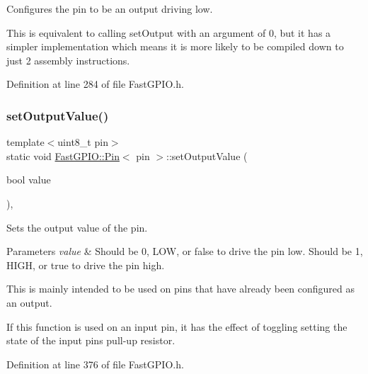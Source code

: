Configures the pin to be an output driving low. 

This is equivalent to calling set\+Output with an argument of 0, but it has a simpler implementation which means it is more likely to be compiled down to just 2 assembly instructions. 

Definition at line 284 of file Fast\+G\+P\+I\+O.\+h.

\mbox{\label{class_fast_g_p_i_o_1_1_pin_a2caa56e4e3691227794a39f4b233eb67}} 
\subsubsection{\texorpdfstring{set\+Output\+Value()}{setOutputValue()}}
{\footnotesize\ttfamily template$<$uint8\+\_\+t pin$>$ \\
static void \hyperlink{class_fast_g_p_i_o_1_1_pin}{Fast\+G\+P\+I\+O\+::\+Pin}$<$ pin $>$\+::set\+Output\+Value (\begin{DoxyParamCaption}\item[{bool}]{value }\end{DoxyParamCaption})\hspace{0.3cm}{\ttfamily [inline]}, {\ttfamily [static]}}



Sets the output value of the pin. 


\begin{DoxyParams}{Parameters}
{\em value} & Should be 0, L\+OW, or false to drive the pin low. Should be 1, H\+I\+GH, or true to drive the pin high.\\
\hline
\end{DoxyParams}
This is mainly intended to be used on pins that have already been configured as an output.

If this function is used on an input pin, it has the effect of toggling setting the state of the input pin\textquotesingle{}s pull-\/up resistor. 

Definition at line 376 of file Fast\+G\+P\+I\+O.\+h.

\mbox{\label{class_fast_g_p_i_o_1_1_pin_a69cae733ab5c400afbb2d731aa31f5f5}} 
